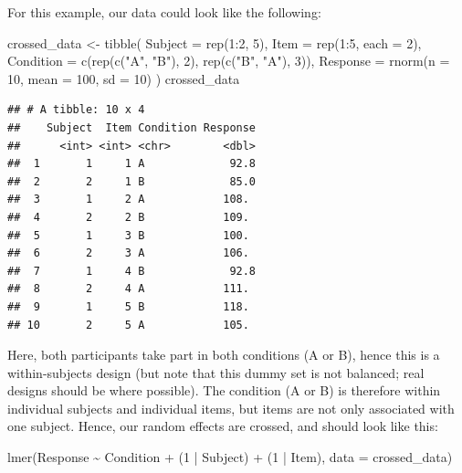 \documentclass[
]{book}
\newenvironment{Shaded}{\begin{snugshade}}{\end{snugshade}}
\newcommand{\AttributeTok}[1]{\textcolor[rgb]{0.77,0.63,0.00}{#1}}
\newcommand{\DecValTok}[1]{\textcolor[rgb]{0.00,0.00,0.81}{#1}}
\newcommand{\FunctionTok}[1]{\textcolor[rgb]{0.00,0.00,0.00}{#1}}
\newcommand{\NormalTok}[1]{#1}
\newcommand{\OtherTok}[1]{\textcolor[rgb]{0.56,0.35,0.01}{#1}}
\newcommand{\SpecialCharTok}[1]{\textcolor[rgb]{0.00,0.00,0.00}{#1}}
\newcommand{\StringTok}[1]{\textcolor[rgb]{0.31,0.60,0.02}{#1}}
\begin{document}
For this example, our data could look like the following:

\begin{Shaded}
\begin{Highlighting}[]
\NormalTok{crossed\_data }\OtherTok{\textless{}{-}} \FunctionTok{tibble}\NormalTok{(}
  \AttributeTok{Subject =} \FunctionTok{rep}\NormalTok{(}\DecValTok{1}\SpecialCharTok{:}\DecValTok{2}\NormalTok{, }\DecValTok{5}\NormalTok{),}
  \AttributeTok{Item =} \FunctionTok{rep}\NormalTok{(}\DecValTok{1}\SpecialCharTok{:}\DecValTok{5}\NormalTok{, }\AttributeTok{each =} \DecValTok{2}\NormalTok{),}
  \AttributeTok{Condition =} \FunctionTok{c}\NormalTok{(}\FunctionTok{rep}\NormalTok{(}\FunctionTok{c}\NormalTok{(}\StringTok{"A"}\NormalTok{, }\StringTok{"B"}\NormalTok{), }\DecValTok{2}\NormalTok{), }\FunctionTok{rep}\NormalTok{(}\FunctionTok{c}\NormalTok{(}\StringTok{"B"}\NormalTok{, }\StringTok{"A"}\NormalTok{), }\DecValTok{3}\NormalTok{)),}
  \AttributeTok{Response =} \FunctionTok{rnorm}\NormalTok{(}\AttributeTok{n =} \DecValTok{10}\NormalTok{, }\AttributeTok{mean =} \DecValTok{100}\NormalTok{, }\AttributeTok{sd =} \DecValTok{10}\NormalTok{)}
\NormalTok{)}
\NormalTok{crossed\_data}
\end{Highlighting}
\end{Shaded}

\begin{verbatim}
## # A tibble: 10 x 4
##    Subject  Item Condition Response
##      <int> <int> <chr>        <dbl>
##  1       1     1 A             92.8
##  2       2     1 B             85.0
##  3       1     2 A            108. 
##  4       2     2 B            109. 
##  5       1     3 B            100. 
##  6       2     3 A            106. 
##  7       1     4 B             92.8
##  8       2     4 A            111. 
##  9       1     5 B            118. 
## 10       2     5 A            105.
\end{verbatim}

Here, both participants take part in both conditions (A or B), hence this is a within-subjects design (but note that this dummy set is not balanced; real designs should be where possible). The condition (A or B) is therefore within individual subjects and individual items, but items are not only associated with one subject. Hence, our random effects are crossed, and should look like this:

\begin{Shaded}
\begin{Highlighting}[]
\FunctionTok{lmer}\NormalTok{(Response }\SpecialCharTok{\textasciitilde{}}\NormalTok{ Condition }\SpecialCharTok{+}\NormalTok{ (}\DecValTok{1} \SpecialCharTok{|}\NormalTok{ Subject) }\SpecialCharTok{+}\NormalTok{ (}\DecValTok{1} \SpecialCharTok{|}\NormalTok{ Item), }\AttributeTok{data =}\NormalTok{ crossed\_data)}
\end{Highlighting}
\end{Shaded}
\end{document}
